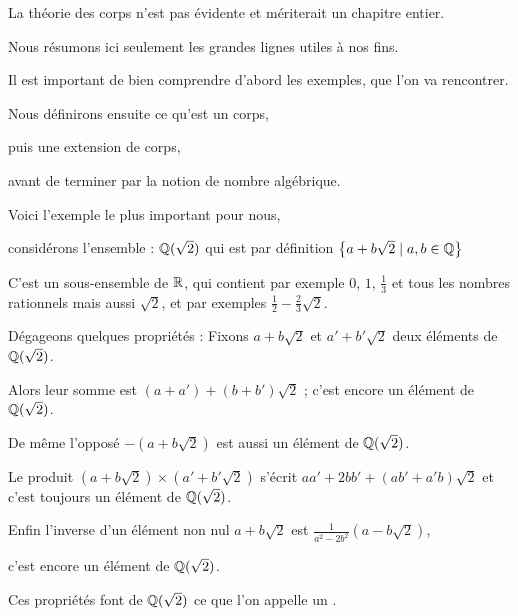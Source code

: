 



\newcommand{\construc}{\mathcal{C}}



\debuttexte


\diapo


La théorie des corps n'est pas évidente et mériterait un chapitre
entier. 

\change
Nous résumons ici seulement les grandes lignes utiles à nos fins.

\change
Il est important de bien comprendre d'abord les exemples, que l'on va rencontrer.

\change
Nous définirons ensuite ce qu'est un corps,

\change
puis une extension de corps,

\change
avant de terminer par la notion de nombre algébrique.


\diapo

Voici l'exemple le plus important pour nous,

considérons l'ensemble :
$\mathbb{Q}(\sqrt 2)$ qui est par définition 
$\left\{ a+b\sqrt 2 \mid a,b \in \mathbb{Q} \right\}$

C'est un sous-ensemble de $\mathbb{R}$, qui contient par exemple $0$, $1$, $\frac13$ et tous les nombres rationnels
mais aussi $\sqrt 2$, et par exemples $\frac 12 - \frac 23 \sqrt 2$. 

\change

Dégageons quelques propriétés :
Fixons $a+b\sqrt 2$ et $a'+b'\sqrt 2$ deux éléments de $\mathbb{Q}(\sqrt 2)$.

\change
Alors leur somme est $(a+a') + (b+b')\sqrt 2$ ; c'est encore un élément de $\mathbb{Q}(\sqrt 2)$.

\change
De même l'opposé $-(a+b\sqrt 2)$ est aussi un élément de $\mathbb{Q}(\sqrt 2)$.

\change
Le produit   $(a+b\sqrt 2)\times(a'+b'\sqrt 2)$ s'écrit 
$aa'+2bb' + (ab'+a'b)\sqrt 2$ et c'est toujours un élément de $\mathbb{Q}(\sqrt 2)$.

\change
Enfin l'inverse d'un élément non nul $a+b\sqrt 2$ est $\frac{1}{a^2-2b^2}(a-b\sqrt 2)$,

c'est encore un élément de $\mathbb{Q}(\sqrt 2)$.

\change
Ces propriétés font de $\mathbb{Q}(\sqrt 2)$ ce que l'on appelle un .

